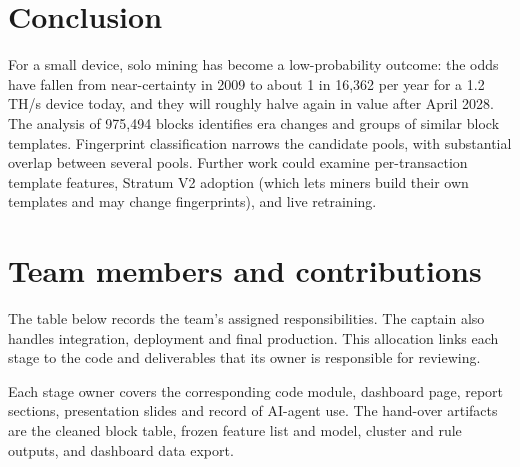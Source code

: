 \documentclass[
  11pt,
  a4paper,
]{article}
\begin{document}
\section{Conclusion}\label{conclusion}

For a small device, solo mining has become a low-probability outcome:
the odds have fallen from near-certainty in 2009 to about 1 in 16,362
per year for a 1.2 TH/s device today, and they will roughly halve again
in value after April 2028. The analysis of 975,494 blocks identifies era
changes and groups of similar block templates. Fingerprint
classification narrows the candidate pools, with substantial overlap
between several pools. Further work could examine per-transaction
template features, Stratum V2 adoption (which lets miners build their
own templates and may change fingerprints), and live retraining.


\section{Team members and
contributions}\label{team-members-and-contributions}

The table below records the team's assigned responsibilities. The
captain also handles integration, deployment and final production. This
allocation links each stage to the code and deliverables that its owner
is responsible for reviewing.

Each stage owner covers the corresponding code module, dashboard page,
report sections, presentation slides and record of AI-agent use. The
hand-over artifacts are the cleaned block table, frozen feature list and
model, cluster and rule outputs, and dashboard data export.
\end{document}
